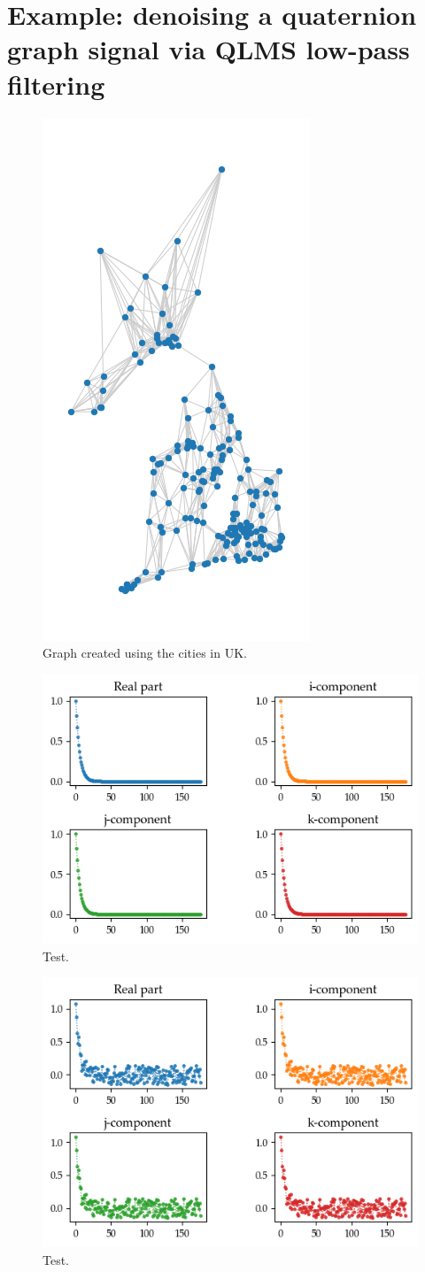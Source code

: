 \section{Example: denoising a quaternion graph signal via QLMS low-pass filtering}

\begin{figure}
	\centering
	\includegraphics[width=0.25\linewidth]{thesis/Figures/uk_graph.png}
	\caption{Graph created using the cities in UK.}
	\label{fig:uk_graph}
\end{figure}

\begin{figure}
	\centering
	\includegraphics[width=0.55\linewidth]{thesis/Figures/uk_graph_kernel.png}
	\caption{Test.}
	\label{fig:uk_graph_kernel}
\end{figure}

\begin{figure}
	\centering
	\includegraphics[width=0.55\linewidth]{thesis/Figures/uk_graph_kernel_noisy.png}
	\caption{Test.}
	\label{fig:uk_graph_kernel_noisy}
\end{figure}

